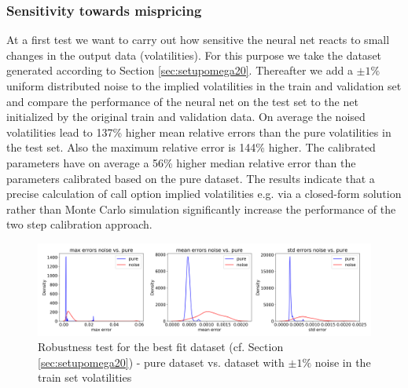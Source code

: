 \documentclass{article}
\begin{document}
\subsubsection{Sensitivity towards mispricing}

At a first test we want to carry out how sensitive the neural net reacts to small changes in the output data (volatilities).  For this purpose we take the dataset generated according to Section \ref{sec:setupomega20}. Thereafter we add a $\pm 1\%$ uniform distributed noise to the implied volatilities in the train and validation set and compare the performance of the neural net on the test set to the net initialized by the original train and validation data. On average the noised volatilities lead to 137\% higher mean relative errors than the pure volatilities in the test set. Also the maximum relative error is 144\% higher. The calibrated parameters have on average a 56\% higher median relative error than the parameters calibrated based on the pure dataset. \newline
The results indicate that a precise calculation of call option implied volatilities e.g. via a closed-form solution rather than Monte Carlo simulation significantly increase the performance of the two step calibration approach.
\begin{figure}[!ht]
\centering
\includegraphics[width=\textwidth]{Robustness_Vola_Noise.png}
\caption{Robustness test for the best fit dataset (cf. Section \ref{sec:setupomega20}) - pure dataset vs. dataset with $\pm 1\%$ noise in the train set volatilities}
\label{fig:MLE_Price_NN_rel_err}
\end{figure}
\end{document}
